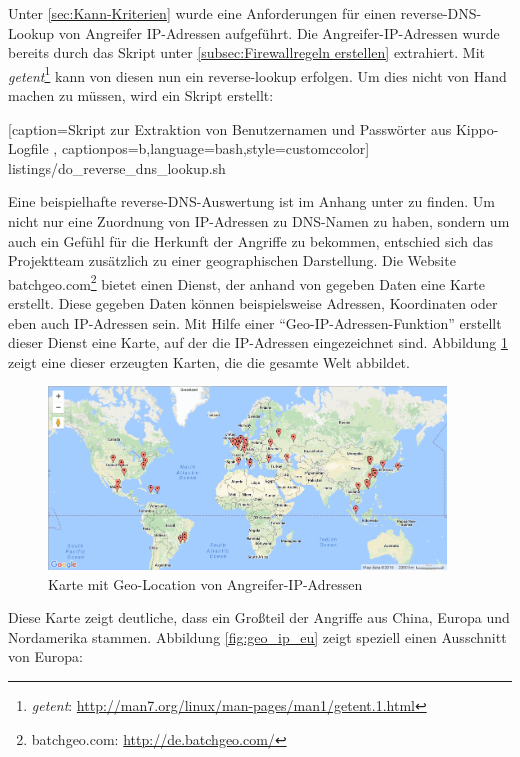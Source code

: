 Unter \ref{sec:Kann-Kriterien} wurde eine Anforderungen für einen reverse-DNS-Lookup von Angreifer IP-Adressen aufgeführt. Die Angreifer-IP-Adressen wurde bereits durch das Skript unter \ref{subsec:Firewallregeln erstellen} extrahiert. Mit \textit{getent}\footnote{ \textit{getent}: \url{http://man7.org/linux/man-pages/man1/getent.1.html}} kann von diesen nun ein reverse-lookup erfolgen. Um dies nicht von Hand machen zu müssen, wird ein Skript erstellt:


    [caption={Skript zur Extraktion von Benutzernamen und Passwörter aus Kippo-Logfile}
       \label{lst:reverse_dns},
       captionpos=b,language=bash,style=customccolor]
 {listings/do_reverse_dns_lookup.sh}

Eine beispielhafte reverse-DNS-Auswertung ist im Anhang unter \textit{} zu finden.
Um nicht nur eine Zuordnung von IP-Adressen zu DNS-Namen zu haben, sondern um auch ein Gefühl für die Herkunft der Angriffe zu bekommen, entschied sich das Projektteam zusätzlich zu einer geographischen Darstellung. Die Website batchgeo.com\footnote{ batchgeo.com: \url{http://de.batchgeo.com/}} bietet einen Dienst, der anhand von gegeben Daten eine Karte erstellt. Diese gegeben Daten können beispielsweise Adressen, Koordinaten oder eben auch IP-Adressen sein. Mit Hilfe einer "`Geo-IP-Adressen-Funktion"' erstellt dieser Dienst eine Karte, auf der die IP-Adressen eingezeichnet sind. Abbildung \ref{fig:geo_ip_world} zeigt eine dieser erzeugten Karten, die die gesamte Welt abbildet.

\begin{figure}[ht]
	\centering
		\includegraphics[width=0.94\textwidth]{img/geo_ip_world.png}
	\caption{Karte mit Geo-Location von Angreifer-IP-Adressen}
	\label{fig:geo_ip_world}
\end{figure}

Diese Karte zeigt deutliche, dass ein Großteil der Angriffe aus China, Europa und Nordamerika stammen. Abbildung \ref{fig:geo_ip_eu} zeigt speziell einen Ausschnitt von Europa:

